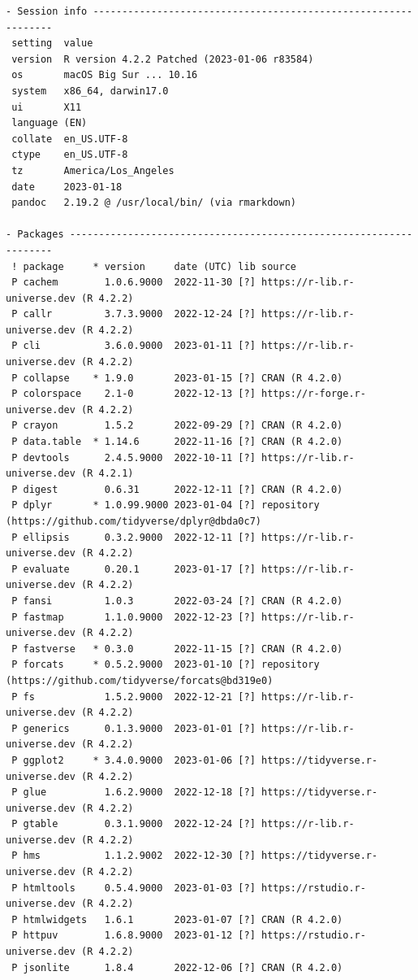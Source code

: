 \documentclass[
  super,
  preprint,
  3p]{elsarticle}
\begin{document}
\begin{verbatim}
- Session info ---------------------------------------------------------------
 setting  value
 version  R version 4.2.2 Patched (2023-01-06 r83584)
 os       macOS Big Sur ... 10.16
 system   x86_64, darwin17.0
 ui       X11
 language (EN)
 collate  en_US.UTF-8
 ctype    en_US.UTF-8
 tz       America/Los_Angeles
 date     2023-01-18
 pandoc   2.19.2 @ /usr/local/bin/ (via rmarkdown)

- Packages -------------------------------------------------------------------
 ! package     * version     date (UTC) lib source
 P cachem        1.0.6.9000  2022-11-30 [?] https://r-lib.r-universe.dev (R 4.2.2)
 P callr         3.7.3.9000  2022-12-24 [?] https://r-lib.r-universe.dev (R 4.2.2)
 P cli           3.6.0.9000  2023-01-11 [?] https://r-lib.r-universe.dev (R 4.2.2)
 P collapse    * 1.9.0       2023-01-15 [?] CRAN (R 4.2.0)
 P colorspace    2.1-0       2022-12-13 [?] https://r-forge.r-universe.dev (R 4.2.2)
 P crayon        1.5.2       2022-09-29 [?] CRAN (R 4.2.0)
 P data.table  * 1.14.6      2022-11-16 [?] CRAN (R 4.2.0)
 P devtools      2.4.5.9000  2022-10-11 [?] https://r-lib.r-universe.dev (R 4.2.1)
 P digest        0.6.31      2022-12-11 [?] CRAN (R 4.2.0)
 P dplyr       * 1.0.99.9000 2023-01-04 [?] repository (https://github.com/tidyverse/dplyr@dbda0c7)
 P ellipsis      0.3.2.9000  2022-12-11 [?] https://r-lib.r-universe.dev (R 4.2.2)
 P evaluate      0.20.1      2023-01-17 [?] https://r-lib.r-universe.dev (R 4.2.2)
 P fansi         1.0.3       2022-03-24 [?] CRAN (R 4.2.0)
 P fastmap       1.1.0.9000  2022-12-23 [?] https://r-lib.r-universe.dev (R 4.2.2)
 P fastverse   * 0.3.0       2022-11-15 [?] CRAN (R 4.2.0)
 P forcats     * 0.5.2.9000  2023-01-10 [?] repository (https://github.com/tidyverse/forcats@bd319e0)
 P fs            1.5.2.9000  2022-12-21 [?] https://r-lib.r-universe.dev (R 4.2.2)
 P generics      0.1.3.9000  2023-01-01 [?] https://r-lib.r-universe.dev (R 4.2.2)
 P ggplot2     * 3.4.0.9000  2023-01-06 [?] https://tidyverse.r-universe.dev (R 4.2.2)
 P glue          1.6.2.9000  2022-12-18 [?] https://tidyverse.r-universe.dev (R 4.2.2)
 P gtable        0.3.1.9000  2022-12-24 [?] https://r-lib.r-universe.dev (R 4.2.2)
 P hms           1.1.2.9002  2022-12-30 [?] https://tidyverse.r-universe.dev (R 4.2.2)
 P htmltools     0.5.4.9000  2023-01-03 [?] https://rstudio.r-universe.dev (R 4.2.2)
 P htmlwidgets   1.6.1       2023-01-07 [?] CRAN (R 4.2.0)
 P httpuv        1.6.8.9000  2023-01-12 [?] https://rstudio.r-universe.dev (R 4.2.2)
 P jsonlite      1.8.4       2022-12-06 [?] CRAN (R 4.2.0)

\end{verbatim}
\end{document}
